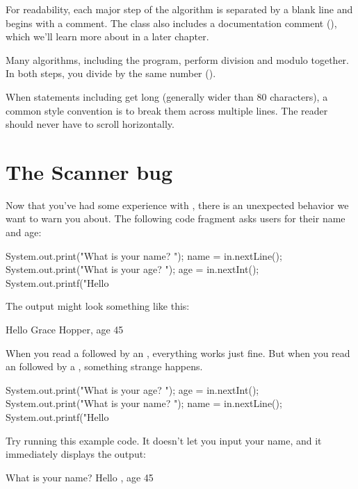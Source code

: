 For readability, each major step of the algorithm is separated by a blank line and begins with a comment.
The class also includes a documentation comment (\java{/**}), which we'll learn more about in a later chapter.

Many algorithms, including the  program, perform division and modulo together.
In both steps, you divide by the same number ().

When statements including  get long (generally wider than 80 characters), a common style convention is to break them across multiple lines.
The reader should never have to scroll horizontally.


\section{The Scanner bug}

Now that you've had some experience with , there is an unexpected behavior we want to warn you about.
The following code fragment asks users for their name and age:

\begin{code}
System.out.print("What is your name? ");
name = in.nextLine();
System.out.print("What is your age? ");
age = in.nextInt();
System.out.printf("Hello %
\end{code}

The output might look something like this:

\begin{stdout}
Hello Grace Hopper, age 45
\end{stdout}

When you read a  followed by an , everything works just fine.
But when you read an  followed by a , something strange happens.

\begin{code}
System.out.print("What is your age? ");
age = in.nextInt();
System.out.print("What is your name? ");
name = in.nextLine();
System.out.printf("Hello %
\end{code}

Try running this example code.
It doesn't let you input your name, and it immediately displays the output:

\begin{stdout}
What is your name? Hello , age 45
\end{stdout}

